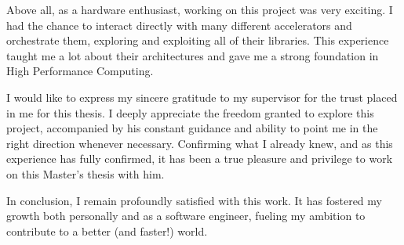 Above all, as a hardware enthusiast, working on this project was very exciting. I had the chance to interact directly with many different accelerators and orchestrate them, exploring and exploiting all of their libraries. This experience taught me a lot about their architectures and gave me a strong foundation in High Performance Computing.

I would like to express my sincere gratitude to my supervisor for the trust placed in me for this thesis. I deeply appreciate the freedom granted to explore this project, accompanied by his constant guidance and ability to point me in the right direction whenever necessary. Confirming what I already knew, and as this experience has fully confirmed, it has been a true pleasure and privilege to work on this Master's thesis with him.

In conclusion, I remain profoundly satisfied with this work. It has fostered my growth both personally and as a software engineer, fueling my ambition to contribute to a better (and faster!) world.

